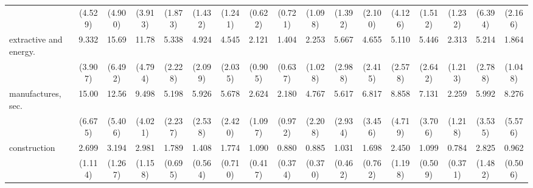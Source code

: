 {\begin{tabular}{l*{16}{c}}
                    &     (4.529)         &     (4.900)         &     (3.913)         &     (1.873)         &     (1.432)         &     (1.241)         &     (0.622)         &     (0.721)         &     (1.098)         &     (1.392)         &     (2.100)         &     (4.126)         &     (1.512)         &     (1.232)         &     (6.394)         &     (2.166)         \\
[1em]
extractive and energy.&       9.332\sym{***}&       15.69\sym{***}&       11.78\sym{***}&       5.338\sym{***}&       4.924\sym{***}&       4.545\sym{***}&       2.121         &       1.404         &       2.253         &       5.667\sym{**} &       4.655\sym{**} &       5.110\sym{**} &       5.446\sym{***}&       2.313         &       5.214\sym{**} &       1.864         \\
                    &     (3.907)         &     (6.492)         &     (4.794)         &     (2.228)         &     (2.099)         &     (2.035)         &     (0.905)         &     (0.637)         &     (1.028)         &     (2.988)         &     (2.415)         &     (2.578)         &     (2.642)         &     (1.213)         &     (2.788)         &     (1.048)         \\
[1em]
manufactures, sec.  &       15.00\sym{***}&       12.56\sym{***}&       9.498\sym{***}&       5.198\sym{***}&       5.926\sym{***}&       5.678\sym{***}&       2.624\sym{*}  &       2.180         &       4.767\sym{***}&       5.617\sym{***}&       6.817\sym{***}&       8.858\sym{***}&       7.131\sym{***}&       2.259         &       5.992\sym{**} &       8.276\sym{**} \\
                    &     (6.675)         &     (5.406)         &     (4.021)         &     (2.237)         &     (2.538)         &     (2.420)         &     (1.097)         &     (0.972)         &     (2.208)         &     (2.934)         &     (3.456)         &     (4.719)         &     (3.706)         &     (1.218)         &     (3.535)         &     (5.576)         \\
[1em]
construction        &       2.699\sym{*}  &       3.194\sym{**} &       2.981\sym{**} &       1.789         &       1.408         &       1.774         &       1.090         &       0.880         &       0.885         &       1.031         &       1.698         &       2.450         &       1.099         &       0.784         &       2.825\sym{*}  &       0.962         \\
                    &     (1.114)         &     (1.267)         &     (1.158)         &     (0.695)         &     (0.564)         &     (0.710)         &     (0.417)         &     (0.374)         &     (0.370)         &     (0.462)         &     (0.762)         &     (1.198)         &     (0.509)         &     (0.371)         &     (1.482)         &     (0.506)         \\

\end{tabular}}
